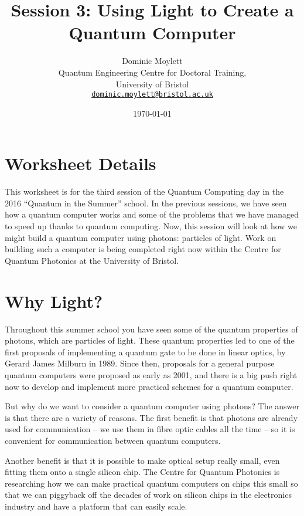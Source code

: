 \documentclass[twocolumn]{article}
\begin{document}
\lstset{style=Style1}

\title{Session 3: Using Light to Create a Quantum Computer}
\author{Dominic Moylett\\
        	Quantum Engineering Centre for Doctoral Training,\\
		University of Bristol\\
		\texttt{\href{mailto:dominic.moylett@bristol.ac.uk}{dominic.moylett@bristol.ac.uk}}
		}
\date{\today}
\maketitle

\section*{Worksheet Details}

This worksheet is for the third session of the Quantum Computing day in the 2016 ``Quantum in the Summer'' school. In the previous sessions, we have seen how a quantum computer works and some of the problems that we have managed to speed up thanks to quantum computing. Now, this session will look at how we might build a quantum computer using photons: particles of light. Work on building such a computer is being completed right now within the Centre for Quantum Photonics at the University of Bristol.

\section{Why Light?}
\label{sec:why}

Throughout this summer school you have seen some of the quantum properties of photons, which are particles of light. These quantum properties led to one of the first proposals of implementing a quantum gate to be done in linear optics, by Gerard James Milburn in 1989. Since then, proposals for a general purpose quantum computers were proposed as early as 2001, and there is a big push right now to develop and implement more practical schemes for a quantum computer.

But why do we want to consider a quantum computer using photons? The answer is that there are a variety of reasons. The first benefit is that photons are already used for communication -- we use them in fibre optic cables all the time -- so it is convenient for communication between quantum computers.

Another benefit is that it is possible to make optical setup really small, even fitting them onto a single silicon chip. The Centre for Quantum Photonics is researching how we can make practical quantum computers on chips this small so that we can piggyback off the decades of work on silicon chips in the electronics industry and have a platform that can easily scale.
\end{document}
